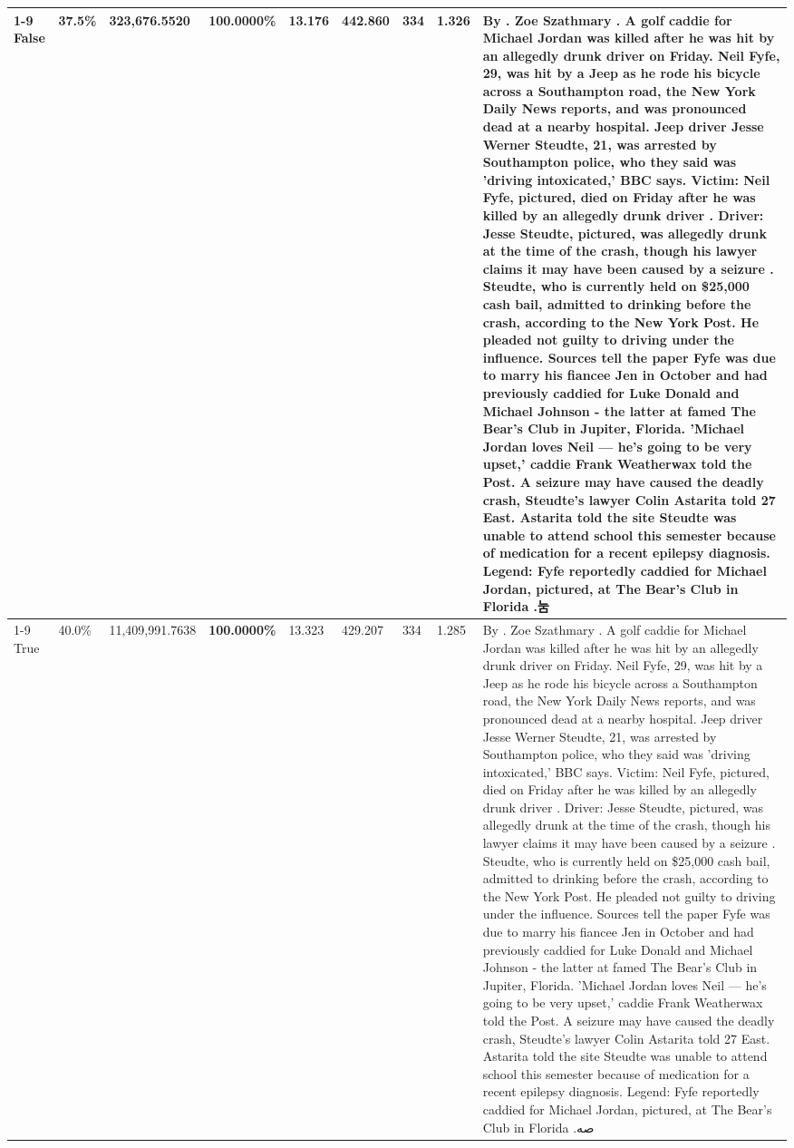 \begin{table}[H]
\begin{tabular}{lllrlllll}
\cline{1-9}
False & 37.5\% & 323,676.5520 & \bfseries \color{red} 100.0000\% & 13.176 & 442.860 & 334 & 1.326 & By . Zoe Szathmary . A golf caddie for Michael Jordan was killed after he was hit by an allegedly drunk driver on Friday. Neil Fyfe, 29, was hit by a Jeep as he rode his bicycle across a Southampton road, the New York Daily News reports, and was pronounced dead at a nearby hospital. Jeep driver Jesse Werner Steudte, 21, was arrested by Southampton police, who they said was 'driving intoxicated,' BBC says. Victim: Neil Fyfe, pictured, died on Friday after he was killed by an allegedly drunk driver . Driver: Jesse Steudte, pictured, was allegedly drunk at the time of the crash, though his lawyer claims it may have been caused by a seizure . Steudte, who is currently held on \$25,000 cash bail, admitted to drinking before the crash, according to the New York Post. He pleaded not guilty to driving under the influence. Sources tell the paper Fyfe was due to marry his fiancee Jen in October and had previously caddied for Luke Donald and Michael Johnson - the latter at famed The Bear's Club in Jupiter, Florida. 'Michael Jordan loves Neil — he’s going to be very upset,' caddie Frank Weatherwax told the Post. A seizure may have caused the deadly crash, Steudte's lawyer Colin Astarita told 27 East. Astarita told the site Steudte was unable to attend school this semester because of medication for a recent epilepsy diagnosis. Legend: Fyfe reportedly caddied for Michael Jordan, pictured, at The Bear's Club in Florida .눔 \\
\cline{1-9}
True & 40.0\% & 11,409,991.7638 & \bfseries \color{red} 100.0000\% & 13.323 & 429.207 & 334 & 1.285 & By . Zoe Szathmary . A golf caddie for Michael Jordan was killed after he was hit by an allegedly drunk driver on Friday. Neil Fyfe, 29, was hit by a Jeep as he rode his bicycle across a Southampton road, the New York Daily News reports, and was pronounced dead at a nearby hospital. Jeep driver Jesse Werner Steudte, 21, was arrested by Southampton police, who they said was 'driving intoxicated,' BBC says. Victim: Neil Fyfe, pictured, died on Friday after he was killed by an allegedly drunk driver . Driver: Jesse Steudte, pictured, was allegedly drunk at the time of the crash, though his lawyer claims it may have been caused by a seizure . Steudte, who is currently held on \$25,000 cash bail, admitted to drinking before the crash, according to the New York Post. He pleaded not guilty to driving under the influence. Sources tell the paper Fyfe was due to marry his fiancee Jen in October and had previously caddied for Luke Donald and Michael Johnson - the latter at famed The Bear's Club in Jupiter, Florida. 'Michael Jordan loves Neil — he’s going to be very upset,' caddie Frank Weatherwax told the Post. A seizure may have caused the deadly crash, Steudte's lawyer Colin Astarita told 27 East. Astarita told the site Steudte was unable to attend school this semester because of medication for a recent epilepsy diagnosis. Legend: Fyfe reportedly caddied for Michael Jordan, pictured, at The Bear's Club in Florida .صه \\

\end{tabular}
\end{table}
